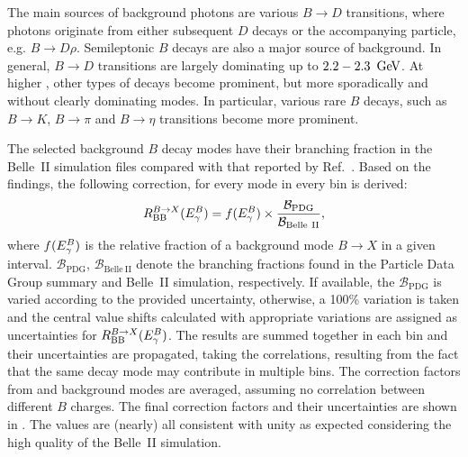 The main sources of background photons are various $B\to D$ transitions, where photons originate from either subsequent $D$ decays or the accompanying particle, e.g. $B\to D\rho$.
Semileptonic $B$ decays are also a major source of background.
In general, $B\to D$ transitions are largely dominating up to $2.2-2.3~\mathrm{\,Ge\kern -0.1em V}$.
At higher \EB, other types of decays become prominent, but more sporadically and without clearly dominating modes.
In particular, various rare $B$ decays, such as $B\to K$, $B\to\pi$ and $B\to\eta$ transitions become more prominent.

The selected background $B$ decay modes have their branching fraction in the Belle~II simulation files compared with that reported by Ref.~\cite{Workman:2022ynf}.
Based on the findings, the following correction, for every mode in every \EB bin is derived:
\begin{equation}\label{eq:background_bf_correction}
    R^{B\rightarrow X}_{\mathrm{BB}}({E^B_{\gamma}}) =  f({E^B_{\gamma}}) \times \frac{\mathcal{B}_{\mathrm{PDG}}}{\mathcal{B}_{\mathrm{Belle~II}}},
\end{equation}
where $f({E^B_{\gamma}})$ is the relative fraction of a background mode $B\to X$ in a given \EB interval.
$\mathcal{B}_{\mathrm{PDG}}$, $\mathcal{B}_{\mathrm{Belle~II}}$ denote the branching fractions found in the Particle Data Group summary \cite{Workman:2022ynf} and Belle~II simulation, respectively.
If available, the $\mathcal{B}_{\mathrm{PDG}}$ is varied according to the provided uncertainty, 
otherwise, a 100\% variation is taken and the central value shifts calculated with appropriate variations are assigned as uncertainties for $R^{B\rightarrow X}_{\mathrm{BB}}({E^B_{\gamma}})$.
The results are summed together in each \EB bin and their uncertainties are propagated, taking the correlations, resulting from the fact that the same decay mode may contribute in multiple \EB bins.
The correction factors from \Bp and \Bz background modes are averaged, assuming no correlation between different $B$ charges.
The final correction factors and their uncertainties are shown in .
The values are (nearly) all consistent with unity as expected considering the high quality of the Belle~II simulation.

